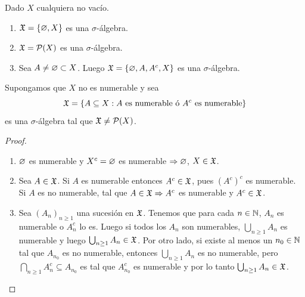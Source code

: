 \begin{eg}
    Dado \(X\) cualquiera no vacío.
    \begin{enumerate}
        \item \(\mathfrak{X} = \{ \varnothing, X \}\) es una \(\sigma\)-álgebra.
        \item \(\mathfrak{X} = \mathcal{P}(X)\) es una \(\sigma\)-álgebra.
        \item Sea \(A \neq \varnothing \subset X\). Luego \(\mathfrak{X} = \{ \varnothing, A, A^c, X \}\) es una \(\sigma\)-álgebra.
    \end{enumerate}
\end{eg}

\begin{eg}
    Supongamos que \(X\) no es numerable y sea
    \begin{equation*}
        \mathfrak{X} = \{ A \subseteq X : A \text{ es numerable ó } A^c \text{ es numerable} \}
    \end{equation*}
    es una \(\sigma\)-álgebra tal que \(\mathfrak{X} \neq \mathcal{P}(X)\).
    \begin{proof}
        \begin{enumerate}
            \item \(\varnothing\) es numerable y \(X^c = \varnothing\) es numerable \(\Rightarrow \varnothing\), \(X \in \mathfrak{X}\).
            \item Sea \(A \in \mathfrak{X}\). Si \(A\) es numerable entonces \(A^c \in \mathfrak{X}\), pues \((A^c)^c\) es numerable.
                 Si \(A\) es no numerable, tal que \(A \in \mathfrak{X} \Rightarrow A^c\) es numerable y \(A^c \in \mathfrak{X}\). 
            \item Sea \((A_n)_{n \geq 1}\) una sucesión en \(\mathfrak{X}\). Tenemos que para cada \(n \in \mathbb{N}\), \(A_n\) es numerable o \(A_n^c\) lo es.
                    Luego si todos los \(A_n\) son numerables, \(\bigcup_{n \geq 1} A_n\) es numerable y luego \(\bigcup_{n \geq 1} A_n \in \mathfrak{X}\). Por otro lado, si existe al menos un \(n_0 \in \mathbb{N}\) tal que \(A_{n_0}\) es no numerable, entonces 
                    \(\bigcup_{n \geq 1} A_n\) es no numerable, pero \(\bigcap_{n \geq 1} A_n^c \subseteq A_{n_0}\) es tal que \(A_{n_0}^c\) es numerable y por lo tanto \(\bigcup_{n \geq 1} A_n \in \mathfrak{X}\). 
        \end{enumerate}
    \end{proof}
\end{eg}


